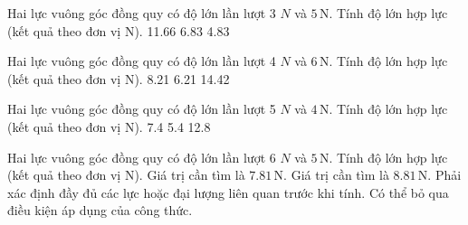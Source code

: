 \begin{ex}
Hai lực vuông góc đồng quy có độ lớn lần lượt 3 $N$ và $5\,\text{N}$. Tính độ lớn hợp lực (kết quả theo đơn vị N).
\choice
{11.66}
{6.83}
{4.83}
{}
\end{ex}

\begin{ex}
Hai lực vuông góc đồng quy có độ lớn lần lượt 4 $N$ và $6\,\text{N}$. Tính độ lớn hợp lực (kết quả theo đơn vị N).
\choice
{}
{8.21}
{6.21}
{14.42}
\end{ex}

\begin{ex}
Hai lực vuông góc đồng quy có độ lớn lần lượt 5 $N$ và $4\,\text{N}$. Tính độ lớn hợp lực (kết quả theo đơn vị N).
\choice
{7.4}
{}
{5.4}
{12.8}
\end{ex}

\begin{ex}
Hai lực vuông góc đồng quy có độ lớn lần lượt 6 $N$ và $5\,\text{N}$. Tính độ lớn hợp lực (kết quả theo đơn vị N).
\choiceTF
{\True Giá trị cần tìm là $7.81\,\text{N}$.}
{Giá trị cần tìm là $8.81\,\text{N}$.}
{\True Phải xác định đầy đủ các lực hoặc đại lượng liên quan trước khi tính.}
{Có thể bỏ qua điều kiện áp dụng của công thức.}
\end{ex}

